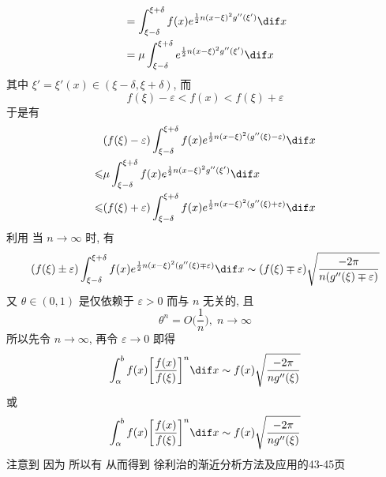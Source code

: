 \documentclass[color=green,titlestyle=hang]{elegantbook}%
\begin{document}
\begin{newproof}
\begin{align*}
&=\int_{\xi-\delta}^{\xi+\delta}f(x)e^{\frac{1}{2}n(x-\xi)^2g''(\xi')}\dif x\\
&=\mu\int_{\xi-\delta}^{\xi+\delta}e^{\frac{1}{2}n(x-\xi)^2g''(\xi')}\dif x
\end{align*}
其中 $\xi'=\xi'(x)\in(\xi-\delta,\xi+\delta)$, 而
\[f(\xi)-\varepsilon<f(x)<f(\xi)+\varepsilon\]
于是有
\begin{align*}
&(f(\xi)-\varepsilon)\int_{\xi-\delta}^{\xi+\delta}f(x)e^{\frac{1}{2}n(x-\xi)^2(g''(\xi)-\varepsilon)}\dif x\\
\leqslant& \mu\int_{\xi-\delta}^{\xi+\delta}f(x)e^{\frac{1}{2}n(x-\xi)^2g''(\xi')}\dif x\\
\leqslant&(f(\xi)+\varepsilon)\int_{\xi-\delta}^{\xi+\delta}f(x)e^{\frac{1}{2}n(x-\xi)^2(g''(\xi)+\varepsilon)}\dif x
\end{align*}
利用  当 $n\to\infty$ 时, 有
\[(f(\xi)\pm\varepsilon)\int_{\xi-\delta}^{\xi+\delta}f(x)e^{\frac{1}{2}n(x-\xi)^2(g''(\xi)\mp\varepsilon)}\dif x\sim(f(\xi)\mp\varepsilon)\sqrt{\frac{-2\pi}{n(g''(\xi)\mp\varepsilon)}}\]
又 $\theta\in(0,1)$ 是仅依赖于 $\varepsilon>0$ 而与 $n$ 无关的, 且
\[\theta^n=O\Big(\frac{1}{n}\Big),\;n\to\infty \]
所以先令 $n\to\infty$, 再令 $\varepsilon\to0$ 即得
\[\int_{\alpha}^bf(x)\bigg[\frac{f(x)}{f(\xi)}\bigg]^n\dif x\sim f(x)\sqrt{\frac{-2\pi}{ng''(\xi)}} \]
或\[\int_{\alpha}^bf(x)\bigg[\frac{f(x)}{f(\xi)}\bigg]^n\dif x\sim f(x)\sqrt{\frac{-2\pi}{ng''(\xi)}} \]
注意到
因为  所以有
从而得到
徐利治的渐近分析方法及应用的43-45页	
\end{newproof}
\end{document}
